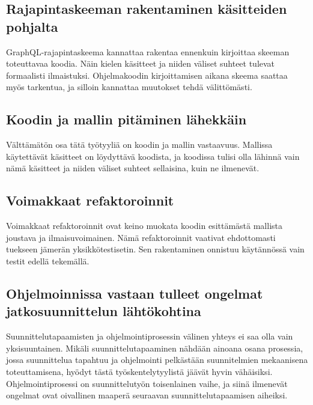 \hypertarget{rajapintaskeeman-rakentaminen-kuxe4sitteiden-pohjalta}{%
\subsection{Rajapintaskeeman rakentaminen käsitteiden
pohjalta}\label{rajapintaskeeman-rakentaminen-kuxe4sitteiden-pohjalta}}

GraphQL-rajapintaskeema kannattaa rakentaa ennenkuin kirjoittaa skeeman
toteuttavaa koodia. Näin kielen käsitteet ja niiden väliset suhteet
tulevat formaalisti ilmaistuksi. Ohjelmakoodin kirjoittamisen aikana
skeema saattaa myös tarkentua, ja silloin kannattaa muutokset tehdä
välittömästi.

\hypertarget{koodin-ja-mallin-pituxe4minen-luxe4hekkuxe4in}{%
\subsection{Koodin ja mallin pitäminen
lähekkäin}\label{koodin-ja-mallin-pituxe4minen-luxe4hekkuxe4in}}

Välttämätön osa tätä työtyyliä on koodin ja mallin vastaavuus. Mallissa
käytettävät käsitteet on löydyttävä koodista, ja koodissa tulisi olla
lähinnä vain nämä käsitteet ja niiden väliset suhteet sellaisina, kuin
ne  ilmenevät.

\hypertarget{voimakkaat-refaktoroinnit}{%
\subsection{Voimakkaat refaktoroinnit}\label{voimakkaat-refaktoroinnit}}

Voimakkaat refaktoroinnit ovat keino muokata koodin esittämästä mallista
joustava ja ilmaisuvoimainen. Nämä refaktoroinnit vaativat ehdottomasti
tuekseen jämerän yksikkötestisetin. Sen rakentaminen onnistuu
käytännössä vain testit edellä tekemällä.

\hypertarget{ohjelmoinnissa-vastaan-tulleet-ongelmat-jatkosuunnittelun-luxe4htuxf6kohtina}{%
\subsection{Ohjelmoinnissa vastaan tulleet ongelmat jatkosuunnittelun
lähtökohtina}\label{ohjelmoinnissa-vastaan-tulleet-ongelmat-jatkosuunnittelun-luxe4htuxf6kohtina}}

Suunnittelutapaamisten ja ohjelmointiprosessin välinen yhteys ei saa
olla vain yksisuuntainen. Mikäli suunnittelutapaaminen nähdään ainoana
osana prosessia, jossa suunnittelua tapahtuu ja ohjelmointi pelkästään
suunnitelmien mekaanisena toteuttamisena, hyödyt tästä
työskentelytyylistä jäävät hyvin vähäisiksi. Ohjelmointiprosessi on
suunnittelutyön toisenlainen vaihe, ja siinä ilmenevät ongelmat ovat
oivallinen maaperä seuraavan suunnittelutapaamisen aiheiksi.

